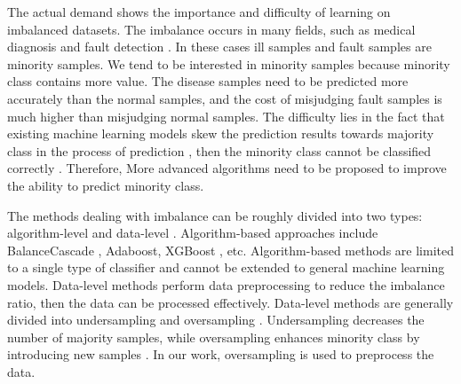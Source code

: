 \documentclass[ida]{iosart2x}
\begin{document}
The actual demand shows the importance and difficulty of learning on imbalanced datasets.
The imbalance occurs in many fields, such as medical 
diagnosis \cite{2013Computational,2019Electrocardiogram} and fault detection \cite{2018Imbalanced}.
In these cases ill samples and fault samples are minority samples.
We tend to be interested in minority samples because minority class contains more value. 
The disease samples need to be predicted more accurately than the normal samples, 
and the cost of misjudging fault samples is much higher than misjudging normal samples.
The difficulty %
lies in the fact that existing machine 
learning models skew the prediction results towards 
majority class in the process of prediction \cite{Victoria2013An}, then 
the minority class cannot be classified correctly \cite{2016A}. 
Therefore, More advanced algorithms need to 
be proposed to improve the ability to predict minority class.

The methods dealing with imbalance can be roughly
divided into two types: algorithm-level \cite{2007Highcost-sensitive} and data-level \cite{2002SMOTE}.
Algorithm-based approaches include BalanceCascade \cite{2019Class}, Adaboost, 
XGBoost \cite{Chen_2016}, etc. 
Algorithm-based methods are limited 
to a single type of classifier \cite{2020Combined} and 
cannot be extended to general machine learning models.
Data-level methods perform data preprocessing to reduce the imbalance ratio, then 
the data can be processed effectively.
Data-level methods are generally divided into undersampling \cite{2015Undersampled} 
and oversampling \cite{2002SMOTE}. 
Undersampling decreases the number of majority samples, %
while oversampling enhances minority class by introducing new samples \cite{2010A}.
In our work, oversampling is used to preprocess the data.
\end{document}
